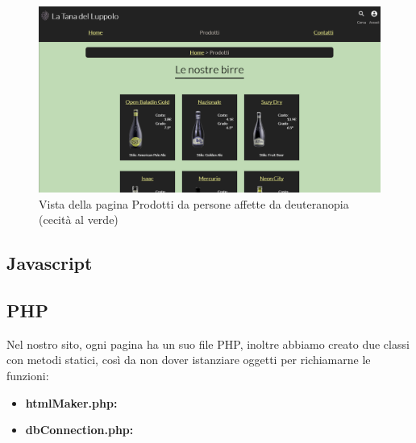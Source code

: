 \begin{figure}[H]
	\centering
	\includegraphics[width=16cm]{utility/prodotti_deuteranopia.png}
	\caption{Vista della pagina Prodotti da persone affette da deuteranopia (cecità al verde)}
\end{figure}


\subsection{Javascript}
\subsection{PHP}
Nel nostro sito, ogni pagina ha un suo file PHP, inoltre abbiamo creato due classi con metodi statici, così da non dover istanziare oggetti per richiamarne le funzioni:
\begin{itemize}
\item \textbf{htmlMaker.php:}
\item \textbf{dbConnection.php:}
\end{itemize}